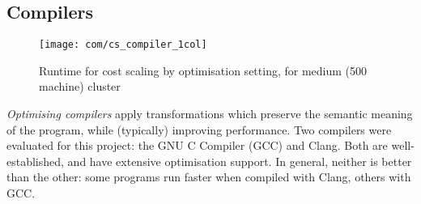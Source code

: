 %
%
%
%

\subsection{Compilers}

\begin{figure}
    \texttt{[image: com/cs\_compiler\_1col]}
    \caption{Runtime for cost scaling by optimisation setting, for medium (500 machine) cluster}
    \label{fig:compiler-settings}
\end{figure}


\emph{Optimising compilers} apply transformations which preserve the semantic meaning of the program, while (typically) improving performance. Two compilers were evaluated for this project: the GNU C Compiler (GCC) and Clang. Both are well-established, and have extensive optimisation support. In general, neither is better than the other: some programs run faster when compiled with Clang, others with GCC.

